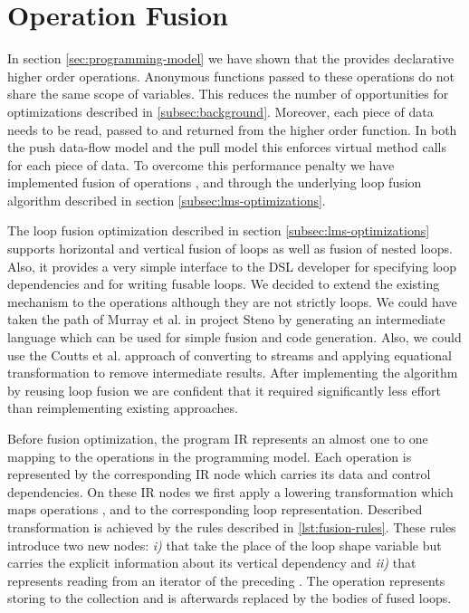 \section{Operation Fusion}
\label{sec:fusion}

In section \ref{sec:programming-model} we have shown that the  provides declarative higher order operations. Anonymous functions passed to these operations do not share the same scope of variables. This reduces the number of opportunities for optimizations described in \ref{subsec:background}. Moreover, each piece of data needs to be read, passed to and returned from the higher order function. In both the push data-flow model and the pull model this enforces virtual method calls \cite{Steno} for each piece of data. To overcome this performance penalty we have implemented fusion of operations ,  and  through the underlying loop fusion algorithm described in section \ref{subsec:lms-optimizations}. 

The loop fusion optimization described in section \ref{subsec:lms-optimizations} supports horizontal and vertical fusion of loops as well as fusion of nested loops. Also, it provides a very simple interface to the DSL developer for specifying loop dependencies and for writing fusable loops. We decided to extend the existing mechanism to the  operations although they are not strictly loops. We could have taken the path of Murray et al. in project Steno \cite{murray_steno:_2011} by generating an intermediate language which can be used for simple fusion and code generation. Also, we could use the Coutts et al. \cite{coutts_stream_2007} approach of converting  to streams and applying equational transformation to remove intermediate results. After implementing the algorithm by reusing loop fusion we are confident that it required significantly less effort than reimplementing existing approaches.

Before fusion optimization, the program IR represents an almost one to one mapping to the operations in the programming model. Each operation is represented by the corresponding IR node which carries its data and control dependencies. On these IR nodes we first apply a lowering transformation which maps operations ,  and  to the corresponding loop representation. Described transformation is achieved by the rules described in \ref{lst:fusion-rules}. These rules introduce two new nodes: \emph{i)}  that take the place of the loop shape variable  but carries the explicit information about its vertical dependency and \emph{ii)}  that represents reading from an iterator of the preceding . The  operation represents storing to the collection and is afterwards replaced by the bodies of fused loops.

